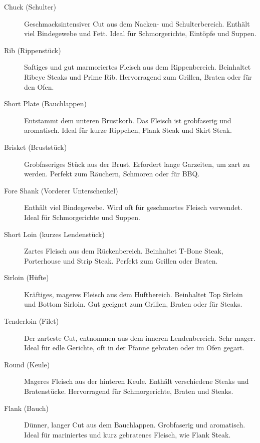 \begin{description}
	
	\item [Chuck (Schulter)] Geschmacksintensiver Cut aus dem Nacken- und 
	Schulterbereich. Enthält viel Bindegewebe und Fett. 
	Ideal für Schmorgerichte, Eintöpfe und Suppen.
	
	\item [Rib (Rippenstück)] Saftiges und gut marmoriertes Fleisch aus dem 
	Rippenbereich. Beinhaltet Ribeye Steaks und Prime Rib.
	Hervorragend zum Grillen, Braten oder für den Ofen.
	
	\item [Short Plate (Bauchlappen)] Entstammt dem unteren Brustkorb. Das 
	Fleisch ist grobfaserig und aromatisch.
	Ideal für kurze Rippchen, Flank Steak und Skirt Steak.
	
	\item [Brisket (Bruststück)] Grobfaseriges Stück aus der Brust. Erfordert 
	lange Garzeiten, um zart zu werden.
	Perfekt zum Räuchern, Schmoren oder für BBQ.
	
	\item [Fore Shank (Vorderer Unterschenkel)] Enthält viel Bindegewebe. 
	Wird oft für geschmortes Fleisch verwendet.
	Ideal für Schmorgerichte und Suppen.
	
	\item [Short Loin (kurzes Lendenstück)] Zartes Fleisch aus dem 
	Rückenbereich. Beinhaltet T-Bone Steak, Porterhouse und Strip Steak.
	Perfekt zum Grillen oder Braten.
	
	\item [Sirloin (Hüfte)] Kräftiges, mageres Fleisch aus dem Hüftbereich. 
	Beinhaltet Top Sirloin und Bottom Sirloin.
	Gut geeignet zum Grillen, Braten oder für Steaks.
	
	\item [Tenderloin (Filet)] Der zarteste Cut, entnommen aus dem inneren 
	Lendenbereich. Sehr mager.
	Ideal für edle Gerichte, oft in der Pfanne gebraten oder im Ofen gegart.
	
	\item [Round (Keule)] Mageres Fleisch aus der hinteren Keule. Enthält 
	verschiedene Steaks und Bratenstücke. 
	Hervorragend für Schmorgerichte, Braten und Steaks.
	
	\item [Flank (Bauch)] Dünner, langer Cut aus dem Bauchlappen. 
	Grobfaserig und aromatisch.
	Ideal für mariniertes und kurz gebratenes Fleisch, wie Flank Steak.
	

\end{description}
